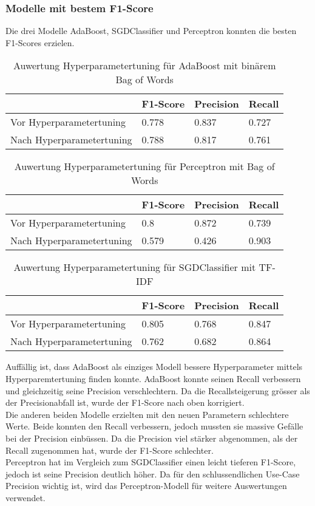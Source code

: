 \subsubsection{Modelle mit bestem F1-Score}
Die drei Modelle AdaBoost, SGDClassifier und Perceptron konnten die besten F1-Scores erzielen.\\
\begin{table}
	\caption{Auwertung Hyperparametertuning für AdaBoost mit binärem Bag of Words}
	\centering
	\begin{tabular}{|l|l|l|l|}
		\hline
		 & F1-Score & Precision & Recall\\
		\hline
		Vor Hyperparametertuning & 0.778 & 0.837 & 0.727 \\
		Nach Hyperparametertuning & 0.788 & 0.817 & 0.761 \\
		\hline
	\end{tabular}
\end{table}
\begin{table}
	\caption{Auwertung Hyperparametertuning für Perceptron mit Bag of Words}
	\centering
	\begin{tabular}{|l|l|l|l|}
		\hline
		& F1-Score & Precision & Recall\\
		\hline
		Vor Hyperparametertuning & 0.8 & 0.872 & 0.739 \\
		Nach Hyperparametertuning & 0.579 & 0.426 & 0.903 \\
		\hline
	\end{tabular}
\end{table}
\begin{table}
	\caption{Auwertung Hyperparametertuning für SGDClassifier mit TF-IDF}
	\centering
	\begin{tabular}{|l|l|l|l|}
		\hline
		& F1-Score & Precision & Recall\\
		\hline
		Vor Hyperparametertuning & 0.805 & 0.768 & 0.847 \\
		Nach Hyperparametertuning & 0.762 & 0.682 & 0.864 \\
		\hline
	\end{tabular}
\end{table}
Auffällig ist, dass AdaBoost als einziges Modell bessere Hyperparameter mittels Hyperparemtertuning finden konnte.
AdaBoost konnte seinen Recall verbessern und gleichzeitig seine Precision verschlechtern.
Da die Recallsteigerung grösser als der Precisionabfall ist, wurde der F1-Score nach oben korrigiert.\\
Die anderen beiden Modelle erzielten mit den neuen Parametern schlechtere Werte.
Beide konnten den Recall verbessern, jedoch mussten sie massive Gefälle bei der Precision einbüssen.
Da die Precision viel stärker abgenommen, als der Recall zugenommen hat, wurde der F1-Score schlechter.\\
Perceptron hat im Vergleich zum SGDClassifier einen leicht tieferen F1-Score, jedoch ist seine Precision deutlich höher.
Da für den schlussendlichen \glqq Use-Case\grqq{} Precision wichtig ist, wird das Perceptron-Modell für weitere Auswertungen verwendet.

